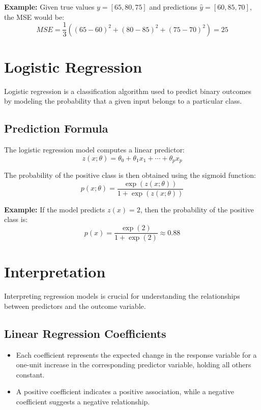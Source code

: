 \documentclass[twocolumn]{article}
\begin{document}
\textbf{Example:} Given true values $y = [65, 80, 75]$ and predictions $\hat{y} = [60, 85, 70]$, the MSE would be:
\begin{equation}
    MSE = \frac{1}{3} ((65-60)^2 + (80-85)^2 + (75-70)^2) = 25
\end{equation}

\section{Logistic Regression}
Logistic regression is a classification algorithm used to predict binary outcomes by modeling the probability that a given input belongs to a particular class.

\subsection{Prediction Formula}
The logistic regression model computes a linear predictor:
\begin{equation}
    z(x; \theta) = \theta_0 + \theta_1 x_1 + \cdots + \theta_p x_p
\end{equation}

The probability of the positive class is then obtained using the sigmoid function:
\begin{equation}
    p(x; \theta) = \frac{\exp(z(x; \theta))}{1 + \exp(z(x; \theta))}
\end{equation}

\textbf{Example:} If the model predicts $z(x) = 2$, then the probability of the positive class is:
\begin{equation}
    p(x) = \frac{\exp(2)}{1 + \exp(2)} \approx 0.88
\end{equation}

\section{Interpretation}
Interpreting regression models is crucial for understanding the relationships between predictors and the outcome variable.

\subsection{Linear Regression Coefficients}
\begin{itemize}
    \item Each coefficient represents the expected change in the response variable for a one-unit increase in the corresponding predictor variable, holding all others constant.
    \item A positive coefficient indicates a positive association, while a negative coefficient suggests a negative relationship.
\end{itemize}
\end{document}
